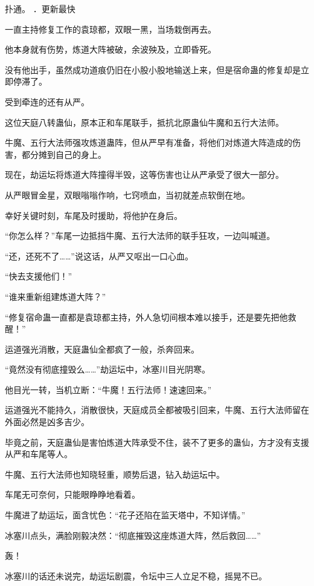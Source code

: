 
\begin{this_body}

扑通。 ．更新最快

一直主持修复工作的袁琼都，双眼一黑，当场栽倒再去。

他本身就有伤势，炼道大阵被破，余波殃及，立即昏死。

没有他出手，虽然成功道痕仍旧在小股小股地输送上来，但是宿命蛊的修复却是立即停滞了。

受到牵连的还有从严。

这位天庭八转蛊仙，原本正和车尾联手，抵抗北原蛊仙牛魔和五行大法师。

牛魔、五行大法师强攻炼道蛊阵，但从严早有准备，将他们对炼道大阵造成的伤害，都分摊到自己的身上。

现在，劫运坛将炼道大阵撞得半毁，这等伤害也让从严承受了很大一部分。

从严眼冒金星，双眼嗡嗡作响，七窍喷血，当初就差点软倒在地。

幸好关键时刻，车尾及时援助，将他护在身后。

“你怎么样？”车尾一边抵挡牛魔、五行大法师的联手狂攻，一边叫喊道。

“还，还死不了……”说这话，从严又呕出一口心血。

“快去支援他们！”

“谁来重新组建炼道大阵？”

“修复宿命蛊一直都是袁琼都主持，外人急切间根本难以接手，还是要先把他救醒！”

运道强光消散，天庭蛊仙全都疯了一般，杀奔回来。

“竟然没有彻底撞毁么……”劫运坛中，冰塞川目光阴寒。

他目光一转，当机立断：“牛魔！五行法师！速速回来。”

运道强光不能持久，消散很快，天庭成员全都被吸引回来，牛魔、五行大法师留在外面必然是凶多吉少。

毕竟之前，天庭蛊仙是害怕炼道大阵承受不住，装不了更多的蛊仙，方才没有支援从严和车尾等人。

牛魔、五行大法师也知晓轻重，顺势后退，钻入劫运坛中。

车尾无可奈何，只能眼睁睁地看着。

牛魔进了劫运坛，面含忧色：“花子还陷在监天塔中，不知详情。”

冰塞川点头，满脸刚毅决然：“彻底摧毁这座炼道大阵，然后救回……”

轰！

冰塞川的话还未说完，劫运坛剧震，令坛中三人立足不稳，摇晃不已。


\end{this_body}
